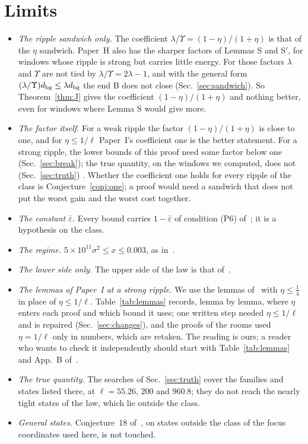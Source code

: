\section{Limits}
\label{sec:limits}

\begin{itemize}
\item \emph{The ripple sandwich only.}
  The coefficient $\lambda/\Upsilon=(1-\eta)/(1+\eta)$ is that of the $\eta$ sandwich.
  Paper~H also has the sharper factors of Lemmas S and S$'$, for windows whose ripple is strong but carries little energy.
  For those factors $\lambda$ and $\Upsilon$ are not tied by $\lambda/\Upsilon=2\lambda-1$, and with the general form $(\lambda/\Upsilon)d_{\rm bg}\le\lambda d_{\rm bg}$ the end B does not close (Sec.~\ref{sec:sandwich}).
  So Theorem~\ref{thm:J} gives the coefficient $(1-\eta)/(1+\eta)$ and nothing better, even for windows where Lemma S would give more.
\item \emph{The factor itself.}
  For a weak ripple the factor $(1-\eta)/(1+\eta)$ is close to one, and for $\eta\le1/\ell$ Paper~I's coefficient one is the better statement.
  For a strong ripple, the lower bounds of this proof need some factor below one (Sec.~\ref{sec:break}); the true quantity, on the windows we computed, does not (Sec.~\ref{sec:truth}) \numst.
  Whether the coefficient one holds for every ripple of the class is Conjecture~\ref{conj:one}; a proof would need a sandwich that does not put the worst gain and the worst cost together.
\item \emph{The constant $\bar\varepsilon$.} Every bound carries $1-\bar\varepsilon$ of condition (P6) of~\cite{F}; it is a hypothesis on the class.
\item \emph{The regime.} $5\times10^{11}\sigma^2\le x\le0.003$, as in~\cite{H,I}.
\item \emph{The lower side only.} The upper side of the law is that of~\cite{F}.
\item \emph{The lemmas of Paper~I at a strong ripple.} We use the lemmas of~\cite{I} with $\eta\le\tfrac14$ in place of $\eta\le1/\ell$. Table~\ref{tab:lemmas} records, lemma by lemma, where $\eta$ enters each proof and which bound it uses; one written step needed $\eta\le1/\ell$ and is repaired (Sec.~\ref{sec:changes}), and the proofs of the rooms used $\eta=1/\ell$ only in numbers, which are retaken. The reading is ours; a reader who wants to check it independently should start with Table~\ref{tab:lemmas} and App.~B of~\cite{I}.
\item \emph{The true quantity.} The searches of Sec.~\ref{sec:truth} cover the families and states listed there, at $\ell=55.26$, $200$ and $960.8$; they do not reach the nearly tight states of the law, which lie outside the class.
\item \emph{General states.} Conjecture~18 of~\cite{F}, on states outside the class of the focus coordinates used here, is not touched.
\end{itemize}
